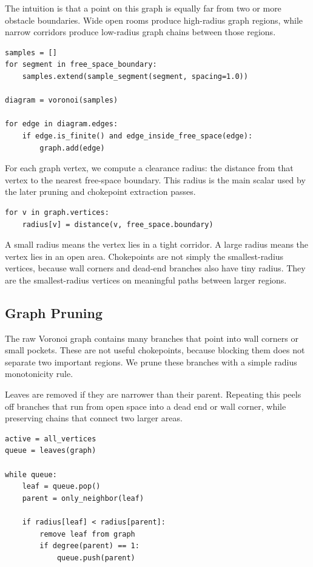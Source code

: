 \documentclass[10pt,sigconf,nonacm]{acmart}
\begin{document}
The intuition is that a point on this graph is equally far from two or
more obstacle boundaries. Wide open rooms produce high-radius graph
regions, while narrow corridors produce low-radius graph chains between
those regions.

\begin{lstlisting}
samples = []
for segment in free_space_boundary:
    samples.extend(sample_segment(segment, spacing=1.0))

diagram = voronoi(samples)

for edge in diagram.edges:
    if edge.is_finite() and edge_inside_free_space(edge):
        graph.add(edge)
\end{lstlisting}

For each graph vertex, we compute a clearance radius: the distance from
that vertex to the nearest free-space boundary. This radius is the main
scalar used by the later pruning and chokepoint extraction passes.

\begin{lstlisting}
for v in graph.vertices:
    radius[v] = distance(v, free_space.boundary)
\end{lstlisting}

A small radius means the vertex lies in a tight corridor. A large radius
means the vertex lies in an open area. Chokepoints are not simply the
smallest-radius vertices, because wall corners and dead-end branches also
have tiny radius. They are the smallest-radius vertices on meaningful
paths between larger regions.

\subsection{Graph Pruning}

The raw Voronoi graph contains many branches that point into wall corners
or small pockets. These are not useful chokepoints, because blocking them
does not separate two important regions. We prune these branches with a
simple radius monotonicity rule.

Leaves are removed if they are narrower than their parent. Repeating this
peels off branches that run from open space into a dead end or wall
corner, while preserving chains that connect two larger areas.

\begin{lstlisting}
active = all_vertices
queue = leaves(graph)

while queue:
    leaf = queue.pop()
    parent = only_neighbor(leaf)

    if radius[leaf] < radius[parent]:
        remove leaf from graph
        if degree(parent) == 1:
            queue.push(parent)
\end{lstlisting}
\end{document}
